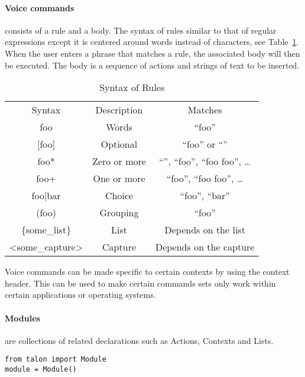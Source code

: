 \documentclass[../thesis.tex]{subfiles}
\begin{document}
\paragraph{Voice commands}
consists of a rule and a body.
The syntax of rules similar to that of regular expressions except it is centered around words instead of characters, see  Table~\ref{tab:rules}.
When the user enters a phrase that matches a rule, the associated body will then be executed.
The body is a sequence of actions and strings of text to be inserted.

\begin{table}[htpb]
    \centering
    \label{tab:rules}
    \begin{tabular}{c|c|c}
        Syntax &	Description &	Matches\\
        foo &	Words &	``foo''\\
        {[foo]} &	Optional &	``foo'' or ``''\\
        foo* &	Zero or more &	``'', ``foo'', ``foo foo'', …\\
        foo+ &	One or more &	“foo”, “foo foo”, …\\
        foo|bar &	Choice &	“foo”, “bar”\\
        (foo) &	Grouping &	“foo”\\
        \{some\_list\} &	List &	Depends on the list\\
        <some\_capture> &	Capture &	Depends on the capture
    \end{tabular}
    \caption{Syntax of Rules}
\end{table}
Voice commands can be made specific to certain contexts by using the context header.
This can be used to make certain commands sets only work within certain applications or operating systems. 

\paragraph{Modules}
are collections of related declarations such as Actions, Contexts and Lists.
\begin{verbatim}
from talon import Module
module = Module()
\end{verbatim}
\end{document}
